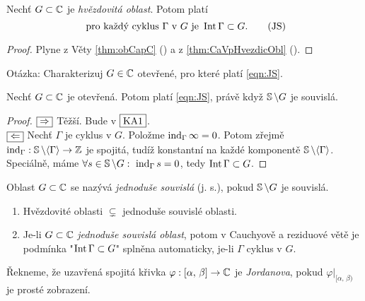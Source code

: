 \begin{note} Nechť $G\subset\operatorname{\mathbb{C}}$ je \emph{hvězdovitá oblast}. Potom platí 
\begin{equation}
    \text{ pro každý cyklus } \Gamma \text{ v } G \text{ je } \operatorname{Int}\Gamma\subset G.
    \tag{JS}
    \label{eqn:JS}
\end{equation}
\end{note}
\begin{proof}
Plyne z Věty \cref{thm:obCapC} () a z \cref{thm:CaVpHvezdicObl} ().
\end{proof}

 Otázka: Charakterizuj $G\in\operatorname{\mathbb{C}}$ otevřené, pro které platí \cref{eqn:JS}.
 
\begin{theorem} 
Nechť $G\subset\operatorname{\mathbb{C}}$ je otevřená. Potom platí \cref{eqn:JS}, právě když $\operatorname{\mathbb{S}}\setminus G$ je souvislá.
\end{theorem}

\begin{proof}
$\fbox{$\Rightarrow$}$ Těžší. Bude v $\fbox{KA1}$.\\
$\fbox{$\Leftarrow$}$ Nechť $\Gamma$ je cyklus v $G$. Položme $\operatorname{ind}_\Gamma \infty=0$. Potom zřejmě $\operatorname{ind}_\Gamma:\operatorname{\mathbb{S}}\setminus\langle\Gamma\rangle\rightarrow \operatorname{\mathbb{Z}}$ je spojitá, tudíž konstantní na každé komponentě $\operatorname{\mathbb{S}}\setminus\langle\Gamma\rangle$. Speciálně, máme $\forall s\in \Sp\setminus G:\ \ind_\Gamma s =0$, tedy $\operatorname{Int}\Gamma\subset G$.
\end{proof}

\begin{definition}
Oblast $G\subset \operatorname{\mathbb{C}}$ se nazývá \emph{jednoduše souvislá} (j. s.), pokud $\operatorname{\mathbb{S}}\setminus G$ je souvislá.
\end{definition}
\newpage

\begin{note}
\begin{enumerate}\mbox{}
    \item 
        Hvězdovité oblasti $\subsetneq$ jednoduše souvislé oblasti.
    \item
        Je-li $G\subset\operatorname{\mathbb{C}}$ \emph{jednoduše souvislá oblast}, potom v Cauchyově a reziduové větě je podmínka "$\operatorname{Int}\Gamma\subset G$"\textbf{ } splněna automaticky, je-li $\Gamma$ cyklus v $G$.
\end{enumerate}
\end{note}

\begin{definition}
Řekneme, že uzavřená spojitá křivka $\varphi:[\alpha,\, \beta]\rightarrow\operatorname{\mathbb{C}}$ je \emph{Jordanova}, pokud $\varphi\big\rvert_{[\alpha,\, \beta)}$ je prosté zobrazení.
\end{definition}

